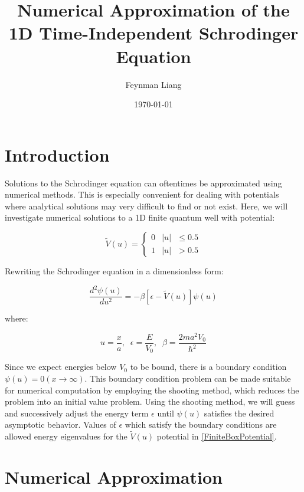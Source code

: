 \documentclass{article}
\title{Numerical Approximation of the 1D Time-Independent Schrodinger Equation}
\author{Feynman Liang}
\date{\today}
\begin{document}
\maketitle

\section{Introduction}

Solutions to the Schrodinger equation can oftentimes be approximated using numerical
methods. This is especially convenient for dealing with potentials where analytical 
solutions may very difficult to find or not exist. Here, we will investigate numerical 
solutions to a 1D finite quantum well with potential:

\begin{equation}\label{FiniteBoxPotential}
    \widetilde{V}(u)=
    \begin{cases} 0 & \text{\(\lvert u\rvert\) $\le 0.5$}
    \\
    1 & \text{\(\lvert u\rvert\) $> 0.5$}
\end{cases}
\end{equation}

Rewriting the Schrodinger equation in a dimensionless form:

\begin{equation}\label{FiniteBoxSchrodinger}
    \frac{d^{2}\psi(u)}{du^{2}} = -\beta\left[\epsilon-\widetilde{V}(u)\right]\psi(u)
\end{equation}

where:

\begin{equation*}
    u = \frac{x}{a},\;\;
    \epsilon = \frac{E}{V_{0}},\;\;
    \beta = \frac{2ma^{2}V_0}{\hbar^2}
\end{equation*}

Since we expect energies below $V_0$ to be bound, there is a boundary condition
$\psi(u) = 0 (x \rightarrow \infty)$. This boundary condition problem can be made
suitable for numerical computation by employing the shooting method, which reduces
the problem into an initial value problem. Using the shooting method, we will guess 
and successively adjust the energy term $\epsilon$ until $\psi(u)$ satisfies
the desired asymptotic behavior. Values of $\epsilon$ which satisfy the boundary
conditions are allowed energy eigenvalues for the $\widetilde{V}(u)$ potential
in \eqref{FiniteBoxPotential}.

\section{Numerical Approximation}
\end{document}
